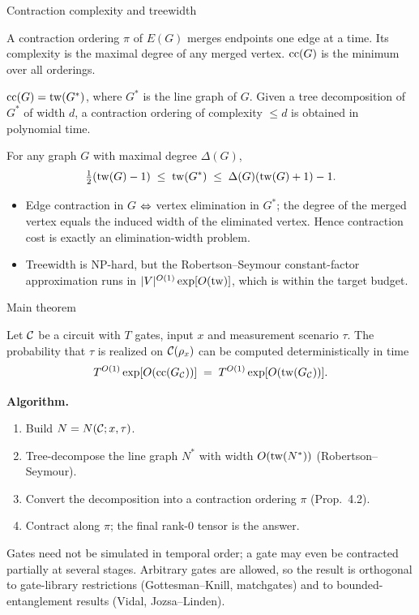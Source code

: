 \begin{frame}{Contraction complexity and treewidth}
    \begin{dfn}
        A contraction ordering $\pi$ of $E(G)$ merges endpoints one edge at a time. Its complexity is the maximal degree of any merged vertex. $\operatorname{cc}(G)$ is the minimum over all orderings.
    \end{dfn}
    \begin{prop}[Prop.~4.2]
        $\operatorname{cc}(G)=\operatorname{tw}(G^*)$, where $G^*$ is the line graph of $G$. Given a tree decomposition of $G^*$ of width $d$, a contraction ordering of complexity $\le d$ is obtained in polynomial time.
    \end{prop}
    \begin{lem}
        For any graph $G$ with maximal degree $\Delta(G)$,
        \[
            \tfrac{1}{2}(\operatorname{tw}(G)-1)\;\le\;\operatorname{tw}(G^*)\;\le\;\Delta(G)(\operatorname{tw}(G)+1)-1 .
        \]
    \end{lem}
    \begin{itemize}
        \item Edge contraction in $G$ $\Leftrightarrow$ vertex elimination in $G^*$; the degree of the merged vertex equals the induced width of the eliminated vertex. Hence contraction cost is exactly an elimination-width problem.
        \item Treewidth is NP-hard, but the Robertson--Seymour constant-factor approximation runs in $|V|^{O(1)}\exp[O(\operatorname{tw})]$, which is within the target budget.
    \end{itemize}
\end{frame}

\begin{frame}{Main theorem}
    \begin{thm}[Thm.~1.1 / 4.6]
        Let $\mathcal{C}$ be a circuit with $T$ gates, input $x$ and measurement scenario $\tau$. The probability that $\tau$ is realized on $\mathcal{C}(\rho_x)$ can be computed deterministically in time
        \[
            T^{O(1)}\exp[O(\operatorname{cc}(G_{\mathcal{C}}))]\;=\;T^{O(1)}\exp[O(\operatorname{tw}(G_{\mathcal{C}}))].
        \]
    \end{thm}
    \textbf{Algorithm.}
    \begin{enumerate}
        \item Build $N=N(\mathcal{C};x,\tau)$.
        \item Tree-decompose the line graph $N^*$ with width $O(\operatorname{tw}(N^*))$ (Robertson--Seymour).
        \item Convert the decomposition into a contraction ordering $\pi$ (Prop.~4.2).
        \item Contract along $\pi$; the final rank-0 tensor is the answer.
    \end{enumerate}
    \begin{rem}
        Gates need not be simulated in temporal order; a gate may even be contracted partially at several stages. Arbitrary gates are allowed, so the result is orthogonal to gate-library restrictions (Gottesman--Knill, matchgates) and to bounded-entanglement results (Vidal, Jozsa--Linden).
    \end{rem}
\end{frame}

